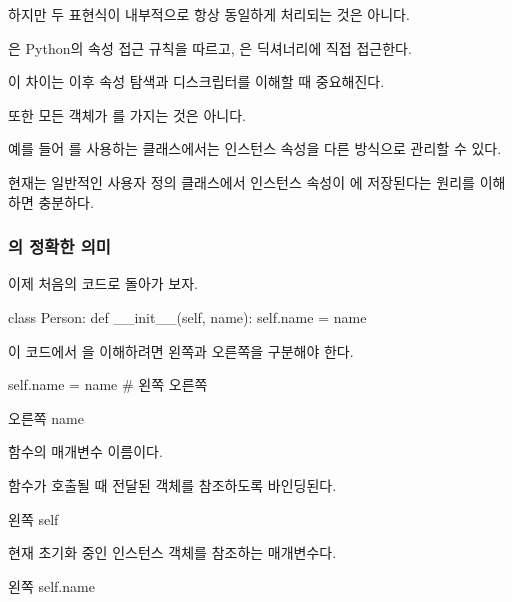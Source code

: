 하지만 두 표현식이 내부적으로 항상 동일하게 처리되는 것은 아니다.

은 Python의 속성 접근 규칙을 따르고, 은 딕셔너리에 직접 접근한다.

이 차이는 이후 속성 탐색과 디스크립터를 이해할 때 중요해진다.

또한 모든 객체가 를 가지는 것은 아니다.

예를 들어 를 사용하는 클래스에서는 인스턴스 속성을 다른 방식으로 관리할 수 있다.

현재는 일반적인 사용자 정의 클래스에서 인스턴스 속성이 에 저장된다는 원리를 이해하면 충분하다.

\subsubsection{의 정확한 의미}

이제 처음의 코드로 돌아가 보자.

\begin{dhkcode}
class Person:
    def __init__(self, name):
        self.name = name
\end{dhkcode}

이 코드에서 을 이해하려면 왼쪽과 오른쪽을 구분해야 한다.

\begin{dhkcode}
self.name = name
#  왼쪽      오른쪽
\end{dhkcode}

\begin{dhknote}
\begin{dhksmry}[centered]
오른쪽 name
\end{dhksmry}
\end{dhknote}

 함수의 매개변수 이름이다.

함수가 호출될 때 전달된 객체를 참조하도록 바인딩된다.

\begin{dhknote}
\begin{dhksmry}[centered]
왼쪽 self
\end{dhksmry}
\end{dhknote}

현재 초기화 중인 인스턴스 객체를 참조하는 매개변수다.

\begin{dhknote}
\begin{dhksmry}[centered]
왼쪽 self.name
\end{dhksmry}
\end{dhknote}

